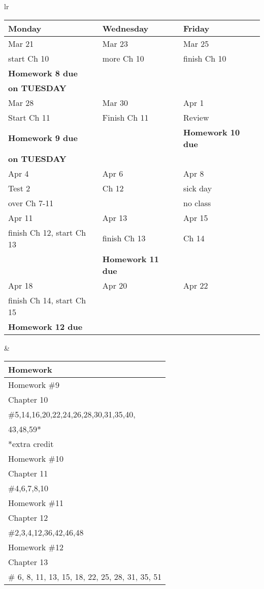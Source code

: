 \documentclass[11pt]{article}
\begin{document}
\newpage
\begin{tabular}{lr}
\begin{tabular}{|l|l|l|}
\hline
Monday & Wednesday & Friday \\
\hline \hline
Mar 21&Mar 23 & Mar 25\\
start Ch 10&more Ch 10&finish Ch 10\\
\textbf{Homework 8 due}&&\\
\textbf{on TUESDAY}&&\\
\hline
Mar 28 & Mar 30 & Apr 1 \\
Start Ch 11 &Finish Ch 11&Review\\
\textbf{Homework 9 due}&&\textbf{Homework 10 due}\\
\textbf{on TUESDAY}&&\\
\hline
Apr 4 & Apr 6 & Apr 8 \\
Test 2 & Ch 12 & sick day  \\
over Ch 7-11 &&no class\\
\hline
Apr 11& Apr 13 & Apr 15 \\
finish Ch 12, start Ch 13&finish Ch 13& Ch 14\\
 &\textbf{Homework 11 due}&\\
\hline
Apr 18 & Apr 20 & Apr 22 \\
finish Ch 14, start Ch 15 &&\\
\textbf{Homework 12 due}&&\\
\hline
\end{tabular}
&
\begin{tabular}{|p{6cm}|}
\hline
Homework \\
\hline \hline
Homework \#9\\
Chapter 10\\
\#5,14,16,20,22,24,26,28,30,31,35,40,\\
43,48,59*\\
*extra credit \\
\hline
Homework \#10\\
Chapter 11\\
\#4,6,7,8,10\\
\hline
Homework \#11\\
Chapter 12\\
\#2,3,4,12,36,42,46,48\\
\hline
Homework \#12\\
Chapter 13\\
\# 6, 8, 11, 13, 15, 18, 22, 25, 28, 31, 35, 51\\
\hline
\end{tabular}
\end{tabular}
\end{document}
